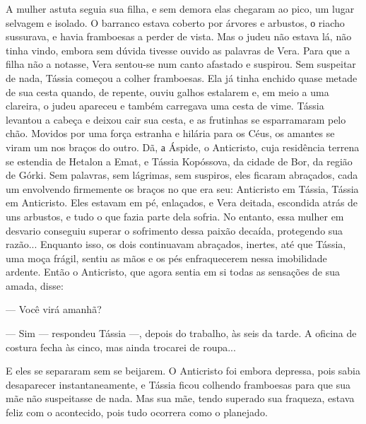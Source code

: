 A mulher astuta seguia sua filha, e sem demora elas chegaram ao pico, um
lugar selvagem e isolado. O barranco estava coberto por árvores e
arbustos, о riacho sussurava, e havia framboesas a perder de vista. Mas
o judeu não estava lá, não tinha vindo, embora sem dúvida tivesse ouvido
as palavras de Vera. Para que a filha não a notasse, Vera sentou-se num
canto afastado e suspirou. Sem suspeitar de nada, Tássia começou a
colher framboesas. Ela já tinha enchido quase metade de sua cesta
quando, de repente, ouviu galhos estalarem e, em meio a uma clareira, o
judeu apareceu e também carregava uma cesta de vime. Tássia levantou a
cabeça e deixou cair sua cesta, e as frutinhas se esparramaram pelo
chão. Movidos por uma força estranha e hilária para os Céus, os amantes
se viram um nos braços do outro. Dã, а Áspide, o Anticristo, cuja
residência terrena se estendia de Hetalon a Emat, e Tássia Kopóssova, da
cidade de Bor, da região de Górki. Sem palavras, sem lágrimas, sem
suspiros, eles ficaram abraçados, cada um envolvendo firmemente os
braços no que era seu: Anticristo em Tássia, Tássia em Anticristo. Eles
estavam em pé, enlaçados, e Vera deitada, escondida atrás de uns
arbustos, e tudo o que fazia parte dela sofria. No entanto, essa mulher
em desvario conseguiu superar o sofrimento dessa paixão decaída,
protegendo sua razão... Enquanto isso, os dois continuavam abraçados,
inertes, até que Tássia, uma moça frágil, sentiu as mãos e os pés
enfraquecerem nessa imobilidade ardente. Então o Anticristo, que agora
sentia em si todas as sensações de sua amada, disse:

--- Você virá amanhã?

--- Sim --- respondeu Tássia ---, depois do trabalho, às seis da tarde.
A oficina de costura fecha às cinco, mas ainda trocarei de roupa...

E eles se separaram sem se beijarem. O Anticristo foi embora depressa,
pois sabia desaparecer instantaneamente, e Tássia ficou colhendo
framboesas para que sua mãe não suspeitasse de nada. Mas sua mãe, tendo
superado sua fraqueza, estava feliz com o acontecido, pois tudo ocorrera
como o planejado.

